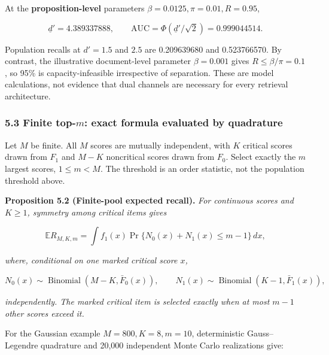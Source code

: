 \documentclass[
  11pt]{article}
\begin{document}
At the \textbf{proposition-level} parameters
\(\beta=0.0125,\pi=0.01,R=0.95\),

\[\underline d'=4.389337888,\qquad \mathrm{AUC}=\Phi(\underline d'/\sqrt2)=0.999044514.\]

Population recalls at \(d'=1.5\) and \(2.5\) are 0.209639680 and
0.523766570. By contrast, the illustrative document-level parameter
\(\beta=0.001\) gives \(R\le\beta/\pi=0.1\), so 95\% is
capacity-infeasible irrespective of separation. These are model
calculations, not evidence that dual channels are necessary for every
retrieval architecture.

\subsubsection{\texorpdfstring{5.3 Finite top-\(m\): exact formula
evaluated by
quadrature}{5.3 Finite top-m: exact formula evaluated by quadrature}}\label{finite-top-m-exact-formula-evaluated-by-quadrature}

Let \(M\) be finite. All \(M\) scores are mutually independent, with
\(K\) critical scores drawn from \(F_1\) and \(M-K\) noncritical scores
drawn from \(F_0\). Select exactly the \(m\) largest scores,
\(1\le m<M\). The threshold is an order statistic, not the population
threshold above.

\textbf{Proposition 5.2 (Finite-pool expected recall).} \emph{For
continuous scores and \(K\ge1\), symmetry among critical items gives}

\[\mathbb E R_{M,K,m}=\int f_1(x)\Pr\{N_0(x)+N_1(x)\le m-1\}\,dx,\]

\emph{where, conditional on one marked critical score \(x\),}

\[N_0(x)\sim\operatorname{Binomial}(M-K,\bar F_0(x)),\qquad N_1(x)\sim\operatorname{Binomial}(K-1,\bar F_1(x)),\]

\emph{independently. The marked critical item is selected exactly when
at most \(m-1\) other scores exceed it.}

For the Gaussian example \(M=800,K=8,m=10\), deterministic
Gauss--Legendre quadrature and 20,000 independent Monte Carlo
realizations give:
\end{document}

